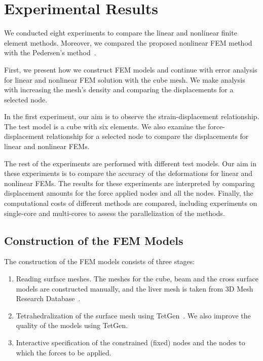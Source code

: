 \chapter{Experimental Results}
\label{chapter6}

We conducted eight experiments to compare the linear and nonlinear finite element methods. Moreover, we compared the proposed nonlinear FEM method with the Pedersen's method~\cite{Pedersen06}.

First, we present how we construct FEM models and continue with error analysis for linear and nonlinear FEM solution with the cube mesh. We make analysis with increasing the mesh's density and comparing the displacements for a selected node.

In the first experiment, our aim is to observe the strain-displacement relationship. The test model is a cube with six elements. We also examine the force-displacement relationship for a selected node to compare the displacements for linear and nonlinear FEMs.

The rest of the experiments are performed with different test models. Our aim in these experiments is to compare the accuracy of the deformations for linear and nonlinear FEMs. The results for these experiments are interpreted by comparing displacement amounts for the force applied nodes and all the nodes. Finally, the computational costs of different methods are compared, including experiments on single-core and multi-cores to assess the parallelization of the methods.

\section{Construction of the FEM Models}

The construction of the FEM models consists of three stages:

\begin{enumerate}
\item Reading surface meshes. The meshes for the cube, beam and the cross surface models are constructed manually, and the liver mesh is taken from 3D Mesh Research Database~\cite{Liver2011}.

\item Tetrahedralization of the surface mesh using TetGen~\cite{Tetgen2011}. We also improve the quality of the models using TetGen.

\item Interactive specification of the constrained (fixed) nodes and the nodes to which the forces to be applied.
\end{enumerate}

